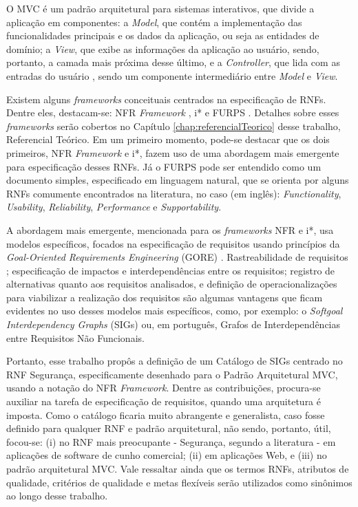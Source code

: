 O MVC é um padrão arquitetural para sistemas interativos, que divide a aplicação em componentes: a \textit{Model}, que contém a implementação das funcionalidades principais e os dados da aplicação, ou seja as entidades de domínio; a \textit{View}, que exibe as informações da aplicação ao usuário, sendo, portanto, a camada mais próxima desse último, e a \textit{Controller}, que lida com as entradas do usuário \cite{buschmann1996system}, sendo um componente intermediário entre \textit{Model} e \textit{View}.  

Existem alguns \textit{frameworks} conceituais centrados na especificação de RNFs. Dentre eles, destacam-se: NFR \textit{Framework} \cite{chung2009non}, i* \cite{istarwiki20} e FURPS \cite{umar2011analyzing}. Detalhes sobre esses \textit{frameworks} serão cobertos no Capítulo \ref{chap:referencialTeorico} desse trabalho, Referencial Teórico. Em um primeiro momento, pode-se destacar que os dois primeiros, NFR \textit{Framework} e i*, fazem uso de uma abordagem mais emergente para especificação desses RNFs. Já o FURPS pode ser entendido como um documento simples, especificado em linguagem natural, que se orienta por alguns RNFs comumente encontrados na literatura, no caso (em inglês): \textit{Functionality}, \textit{Usability}, \textit{Reliability}, \textit{Performance} e \textit{Supportability}.

A abordagem mais emergente, mencionada para os \textit{frameworks} NFR e i*, usa modelos específicos, focados na especificação de requisitos usando princípios da \textit{Goal-Oriented Requirements Engineering} (GORE) \cite{horkoff2016goal}. Rastreabilidade de requisitos \cite{wiegers2013software}; especificação de impactos e interdependências entre os requisitos; registro de alternativas quanto aos requisitos analisados, e definição de operacionalizações para viabilizar a realização dos requisitos são algumas vantagens que ficam evidentes no uso desses modelos mais específicos, como, por exemplo: o \textit{Softgoal Interdependency Graphs} (SIGs) \cite{chung2012non} ou, em português, Grafos de Interdependências entre Requisitos Não Funcionais. 

Portanto, esse trabalho propôs a definição de um Catálogo de SIGs centrado no RNF Segurança, especificamente desenhado para o Padrão Arquitetural MVC, usando a notação do NFR \textit{Framework}. Dentre as contribuições, procura-se auxiliar na tarefa de especificação de requisitos, quando uma arquitetura é imposta. Como o catálogo ficaria muito abrangente e generalista, caso fosse definido para qualquer RNF e padrão arquitetural, não sendo, portanto, útil, focou-se: (i) no RNF mais preocupante - Segurança, segundo a literatura - em aplicações de software de cunho comercial; (ii) em aplicações Web, e (iii) no padrão arquitetural MVC.  Vale ressaltar ainda que os termos RNFs, atributos de qualidade, critérios de qualidade e metas flexíveis serão utilizados como sinônimos ao longo desse trabalho.


